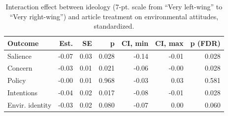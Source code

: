 \begin{table}[h!t]
\centering
\begin{tabular}{lrrrrrr}
  \hline
Outcome & Est. & SE & p & CI, min & CI, max & p (FDR) \\ 
  \hline
Salience & -0.07 & 0.03 & 0.028 & -0.14 & -0.01 & 0.028 \\ 
  Concern & -0.03 & 0.01 & 0.021 & -0.06 & -0.00 & 0.028 \\ 
  Policy & -0.00 & 0.01 & 0.968 & -0.03 & 0.03 & 0.581 \\ 
  Intentions & -0.04 & 0.02 & 0.017 & -0.08 & -0.01 & 0.028 \\ 
  Envir. identity & -0.03 & 0.02 & 0.080 & -0.07 & 0.00 & 0.060 \\ 
   \hline
\end{tabular}
\caption{Interaction effect between ideology (7-pt. scale from ``Very left-wing'' to ``Very right-wing'')
                   and article treatment on environmental attitudes, standardized.} 
\label{tab:main_effects_ideo_hetero}
\end{table}
